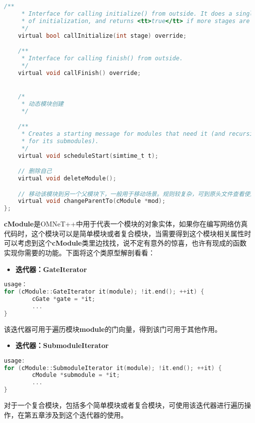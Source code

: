 \begin{lstlisting}[language=c]
    /**
     * Interface for calling initialize() from outside. It does a single stage
     * of initialization, and returns <tt>true</tt> if more stages are required.
     */
    virtual bool callInitialize(int stage) override;

    /**
     * Interface for calling finish() from outside.
     */
    virtual void callFinish() override;


    /*
     * 动态模块创建
     */

    /**
     * Creates a starting message for modules that need it (and recursively
     * for its submodules).
     */
    virtual void scheduleStart(simtime_t t);

    // 删除自己
    virtual void deleteModule();

    // 移动该模块到另一个父模块下，一般用于移动场景。规则较复杂，可到原头文件查看使用说明
    virtual void changeParentTo(cModule *mod);
};
\end{lstlisting}

\textbf{cModule}是OMNeT++中用于代表一个模块的对象实体，如果你在编写网络仿真代码时，这个模块可以是简单模块或者复合模块，当需要得到这个模块相关属性时可以考虑到这个\textbf{cModule}类里边找找，说不定有意外的惊喜，也许有现成的函数实现你需要的功能。下面将这个类原型解剖看看：

\begin{itemize}
\item \textbf{迭代器：GateIterator}

\end{itemize}

\begin{lstlisting}[language=c]
usage：
for (cModule::GateIterator it(module); !it.end(); ++it) {
        cGate *gate = *it;
        ...
}
\end{lstlisting}

该迭代器可用于遍历模块\textbf{module}的门向量，得到该门可用于其他作用。

\begin{itemize}
\item \textbf{迭代器：SubmoduleIterator}

\end{itemize}

\begin{lstlisting}[language=c]
usage:
for (cModule::SubmoduleIterator it(module); !it.end(); ++it) {
        cModule *submodule = *it;
        ...
}
\end{lstlisting}

对于一个复合模块，包括多个简单模块或者复合模块，可使用该迭代器进行遍历操作，在第五章涉及到这个迭代器的使用。

